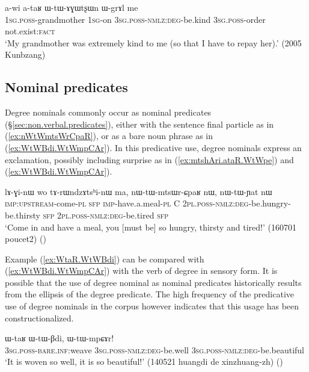 \begin{exe}
\ex \label{ex:ataR.WtWGWtsxWn}
\gll a-wi a-taʁ ɯ-tɯ-ɤɣɯtʂɯn ɯ-grɤl me \\
\textsc{1sg}.\textsc{poss}-grandmother \textsc{1sg}-on \textsc{3sg}.\textsc{poss}-\textsc{nmlz}:\textsc{deg}-be.kind \textsc{3sg}.\textsc{poss}-order not.exist:\textsc{fact} \\
\glt `My grandmother was extremely kind to me (so that I have to repay her).' (2005 Kunbzang)
\end{exe}


\subsection{Nominal predicates} \label{sec:degree.nominal.predicates}
Degree nominals commonly occur as nominal predicates (§\ref{sec:non.verbal.predicates}), either with the sentence final particle  as in (\ref{ex:nWtWmtsWrCpaR}), or as a bare noun phrase as in (\ref{ex:WtWBdi.WtWmpCAr}). In this predicative use, degree nominals express an exclamation, possibly including surprise as in (\ref{ex:mtshAri.ataR.WtWpe}) and (\ref{ex:WtWBdi.WtWmpCAr}).

\begin{exe}
\ex \label{ex:nWtWmtsWrCpaR}
\gll lɤ-ɣi-nɯ wo tɤ-rɯndzɤtsʰi-nɯ ma, nɯ-tɯ-mtsɯr-ɕpaʁ nɯ, nɯ-tɯ-ɲat nɯ\\
\textsc{imp}:\textsc{upstream}-come-\textsc{pl} \textsc{sfp} \textsc{imp}-have.a.meal-\textsc{pl} C \textsc{2pl}.\textsc{poss}-\textsc{nmlz}:\textsc{deg}-be.hungry-be.thirsty \textsc{sfp} \textsc{2pl}.\textsc{poss}-\textsc{nmlz}:\textsc{deg}-be.tired \textsc{sfp} \\
\glt `Come in and have a meal, you [must be] so hungry, thirsty and tired!' (160701 poucet2)	()
\end{exe}

Example (\ref{ex:WtaR.WtWBdi}) can be compared with (\ref{ex:WtWBdi.WtWmpCAr}) with the verb of degree  in sensory form. It is possible that the use of degree nominal as nominal predicates historically results from the ellipsis of the degree predicate. The high frequency of the predicative use of degree nominals in the corpus however indicates that this usage has been constructionalized.

\begin{exe}
\ex \label{ex:WtWBdi.WtWmpCAr}
\gll ɯ-taʁ ɯ-tɯ-βdi, ɯ-tɯ-mpɕɤr! \\
\textsc{3sg}.\textsc{poss}-\textsc{bare}.\textsc{inf}:weave  \textsc{3sg}.\textsc{poss}-\textsc{nmlz}:\textsc{deg}-be.well \textsc{3sg}.\textsc{poss}-\textsc{nmlz}:\textsc{deg}-be.beautiful  \\
\glt `It is woven so well, it is so beautiful!' (140521 huangdi de xinzhuang-zh) 	()
\end{exe}

